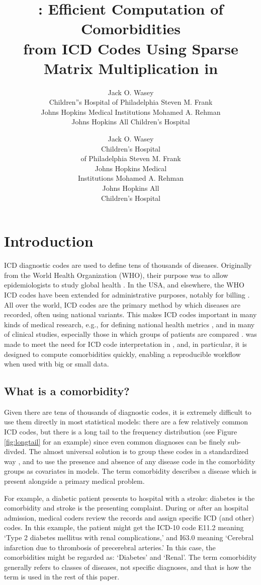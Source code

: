 \documentclass[article]{jss}
\author{
Jack O. Wasey\\Children''s Hospital of Philadelphia \And Steven M. Frank\\Johns Hopkins Medical Institutions \And Mohamed A. Rehman\\Johns Hopkins All Children's Hospital
}
\title{\pkg{icd}: Efficient Computation of Comorbidities\\
from ICD Codes Using Sparse Matrix Multiplication in \proglang{R}}
\author{Jack O. Wasey\\Children's Hospital\\of Philadelphia \And Steven M. Frank\\Johns Hopkins Medical\\Institutions \And Mohamed A. Rehman\\Johns Hopkins All\\Children's Hospital}
\begin{document}
\section{Introduction}\label{introduction}

ICD diagnostic codes are used to define tens of thousands of diseases.
Originally from the World Health Organization (WHO), their purpose was
to allow epidemiologists to study global health
\citep{WHO_whointernationalclassification_2018}. In the USA, and
elsewhere, the WHO ICD codes have been extended for administrative
purposes, notably for billing
\citep{centerformedicaidandmedicareservices_cmsicd10frequently_2017}.
All over the world, ICD codes are the primary method by which diseases
are recorded, often using national variants. This makes ICD codes
important in many kinds of medical research, e.g., for defining national
health metrics \citep{Lee_PredictingMortalityPatients_2003}, and in many
of clinical studies, especially those in which groups of patients are
compared \citep[e.g.,][]{frank_risk-adjusted_2014}.  was made
to meet the need for ICD code interpretation in , and, in
particular, it is designed to compute comorbidities quickly, enabling a
reproducible workflow when used with big or small data.

\subsection{What is a comorbidity?}\label{what-is-a-comorbidity}

Given there are tens of thousands of diagnostic codes, it is extremely
difficult to use them directly in most statistical models: there are a
few relatively common ICD codes, but there is a long tail to the
frequency distribution (see Figure \ref{fig:longtail} for an example)
since even common diagnoses can be finely sub-divded. The almost
universal solution is to group these codes in a standardized way
\citep[e.g.,][]{quan_coding_2005, elixhauser_comorbidity_1998}, and to
use the presence and absence of any disease code in the comorbidity
groups as covariates in models. The term comorbidity describes a disease
which is present alongside a primary medical problem.

For example, a diabetic patient presents to hospital with a stroke:
diabetes is the comorbidity and stroke is the presenting complaint.
During or after an hospital admission, medical coders review the records
and assign specific ICD (and other) codes. In this example, the patient
might get the ICD-10 code E11.2 meaning `Type 2 diabetes mellitus with
renal complications,' and I63.0 meaning `Cerebral infarction due to
thrombosis of precerebral arteries.' In this case, the comorbidities
might be regarded as: `Diabetes' and `Renal'. The term comorbidity
generally refers to classes of diseases, not specific diagnoses, and
that is how the term is used in the rest of this paper.
\end{document}
